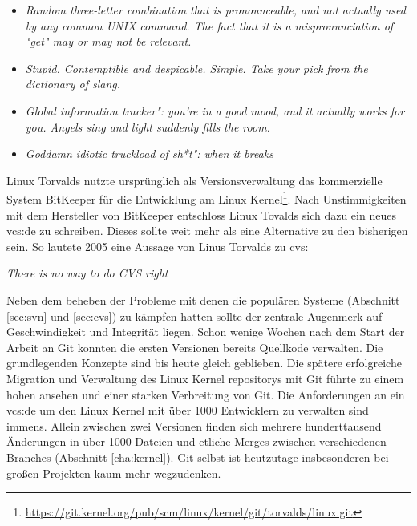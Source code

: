 \begin{itemize}
  \item \textit{\glqq{}Random three-letter combination that is pronounceable, and not
  actually used by any common UNIX command. The fact that it is a
  mispronunciation of "get" may or may not be relevant.\grqq{}}
  \item \textit{\glqq{}Stupid. Contemptible and despicable. Simple. Take your pick from the
  dictionary of slang.\grqq{}}
  \item \textit{\glqq{}Global information tracker": you're in a good mood, and it actually
  works for you. Angels sing and light suddenly fills the room.\grqq{}}
  \item \textit{\glqq{}Goddamn idiotic truckload of sh*t": when it breaks\grqq{}}
\end{itemize}

Linux Torvalds nutzte ursprünglich als Versionsverwaltung das kommerzielle System BitKeeper für
die Entwicklung am Linux
Kernel\footnote{\url{https://git.kernel.org/pub/scm/linux/kernel/git/torvalds/linux.git}}.
Nach Unstimmigkeiten mit dem Hersteller von BitKeeper entschloss Linux Tovalds
sich dazu ein neues \gls{vcs:de} zu schreiben. Dieses sollte weit mehr als
eine Alternative zu den bisherigen sein\cite[s.~13]{gitosp}. So lautete 2005
eine Aussage von Linus Torvalds zu \acrshort{cvs}\cite[s.~385]{cd}:

\begin{center}
\textit{\glqq{}There is no way to do CVS right\grqq{}}\\
\end{center}

Neben dem beheben der Probleme mit denen die populären Systeme (Abschnitt
\ref{sec:svn} und \ref{sec:cvs}) zu kämpfen hatten sollte der zentrale
Augenmerk auf Geschwindigkeit und Integrität liegen. Schon wenige Wochen nach
dem Start der Arbeit an Git konnten die ersten Versionen bereits Quellkode
verwalten. Die grundlegenden Konzepte sind bis heute gleich geblieben. Die
spätere erfolgreiche Migration und Verwaltung des Linux Kernel
\glspl{repository} mit Git führte zu einem hohen ansehen und einer starken
Verbreitung von Git. Die Anforderungen an ein \gls{vcs:de} um den Linux Kernel
mit über 1000 Entwicklern zu verwalten sind immens. Allein zwischen zwei Versionen finden sich mehrere hunderttausend Änderungen in über 1000 Dateien und etliche Merges zwischen verschiedenen Branches (Abschnitt \ref{cha:kernel}). Git selbst ist heutzutage insbesonderen bei großen
Projekten kaum mehr wegzudenken.\cite[s.~13]{gitosp}

